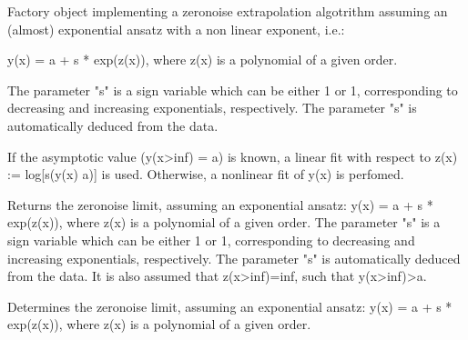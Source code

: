 \documentclass[letterpaper,10pt,english]{sphinxmanual}
\begin{document}
\begin{fulllineitems}
\label{\detokenize{apidoc:mitiq.factories.PolyExpFactory}}
Factory object implementing a zero\sphinxhyphen{}noise extrapolation algotrithm assuming an
(almost) exponential ansatz with a non linear exponent, i.e.:

y(x) = a + s * exp(z(x)), where z(x) is a polynomial of a given order.

The parameter "s" is a sign variable which can be either 1 or \sphinxhyphen{}1, corresponding to
decreasing and increasing exponentials, respectively. The parameter "s" is
automatically deduced from the data.

If the asymptotic value (y(x\sphinxhyphen{}\textgreater{}inf) = a) is known, a linear fit with respect
to z(x) := log{[}s(y(x) \sphinxhyphen{} a){]} is used.
Otherwise, a non\sphinxhyphen{}linear fit of y(x) is perfomed.

\begin{fulllineitems}
\label{\detokenize{apidoc:mitiq.factories.PolyExpFactory.reduce}}
Returns the zero\sphinxhyphen{}noise limit, assuming an exponential ansatz:
y(x) = a + s * exp(z(x)), where z(x) is a polynomial of a given order.
The parameter "s" is a sign variable which can be either 1 or \sphinxhyphen{}1, corresponding to
decreasing and increasing exponentials, respectively. The parameter "s" is
automatically deduced from the data.
It is also assumed that z(x\sphinxhyphen{}\sphinxhyphen{}\textgreater{}inf)=\sphinxhyphen{}inf, such that y(x\sphinxhyphen{}\sphinxhyphen{}\textgreater{}inf)\sphinxhyphen{}\sphinxhyphen{}\textgreater{}a.

\end{fulllineitems}


\begin{fulllineitems}
\label{\detokenize{apidoc:mitiq.factories.PolyExpFactory.static_reduce}}
Determines the zero\sphinxhyphen{}noise limit, assuming an exponential ansatz:
y(x) = a + s * exp(z(x)), where z(x) is a polynomial of a given order.


\end{fulllineitems}
\end{fulllineitems}
\end{document}
